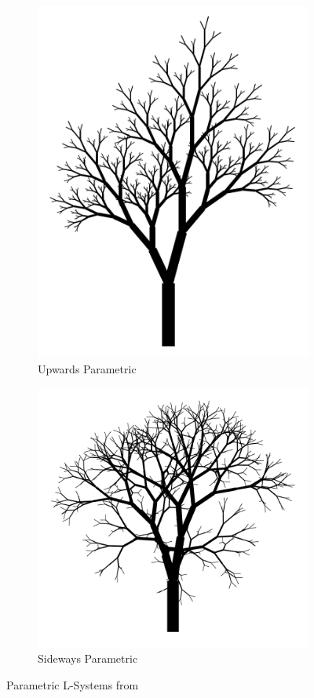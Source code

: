 \documentclass[12pt,twoside]{reedthesis}
\begin{document}
	\begin{figure}[h]
	\centering
	\begin{subfigure}{0.5\linewidth}
		\centering
		\includegraphics[width=0.8\linewidth]{Images/Parametric1}
		\caption{Upwards Parametric}
		\label{UpwardParametric}
	\end{subfigure}%
	\begin{subfigure}{0.5\linewidth}
		\centering
		\includegraphics[width=0.8\linewidth]{Images/Parametric2}
		\caption{Sideways Parametric}
		\label{SidewaysParametric}
	\end{subfigure}
	\caption{Parametric L-Systems from \cite{LSystems2001}}
	\label{Parametric}
	\end{figure}
	
\end{document}
